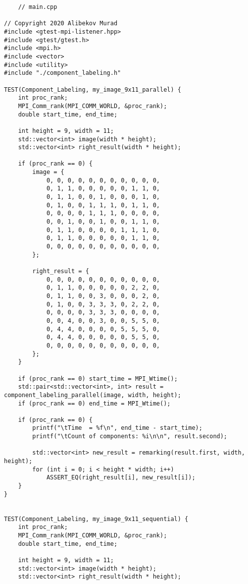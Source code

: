 \documentclass{report}
\begin{document}
	\begin{lstlisting}
	// main.cpp

// Copyright 2020 Alibekov Murad
#include <gtest-mpi-listener.hpp>
#include <gtest/gtest.h>
#include <mpi.h>
#include <vector>
#include <utility>
#include "./component_labeling.h"

TEST(Component_Labeling, my_image_9x11_parallel) {
    int proc_rank;
    MPI_Comm_rank(MPI_COMM_WORLD, &proc_rank);
    double start_time, end_time;

    int height = 9, width = 11;
    std::vector<int> image(width * height);
    std::vector<int> right_result(width * height);

    if (proc_rank == 0) {
        image = {
            0, 0, 0, 0, 0, 0, 0, 0, 0, 0, 0,
            0, 1, 1, 0, 0, 0, 0, 0, 1, 1, 0,
            0, 1, 1, 0, 0, 1, 0, 0, 0, 1, 0,
            0, 1, 0, 0, 1, 1, 1, 0, 1, 1, 0,
            0, 0, 0, 0, 1, 1, 1, 0, 0, 0, 0,
            0, 0, 1, 0, 0, 1, 0, 0, 1, 1, 0,
            0, 1, 1, 0, 0, 0, 0, 1, 1, 1, 0,
            0, 1, 1, 0, 0, 0, 0, 0, 1, 1, 0,
            0, 0, 0, 0, 0, 0, 0, 0, 0, 0, 0,
        };

        right_result = {
            0, 0, 0, 0, 0, 0, 0, 0, 0, 0, 0,
            0, 1, 1, 0, 0, 0, 0, 0, 2, 2, 0,
            0, 1, 1, 0, 0, 3, 0, 0, 0, 2, 0,
            0, 1, 0, 0, 3, 3, 3, 0, 2, 2, 0,
            0, 0, 0, 0, 3, 3, 3, 0, 0, 0, 0,
            0, 0, 4, 0, 0, 3, 0, 0, 5, 5, 0,
            0, 4, 4, 0, 0, 0, 0, 5, 5, 5, 0,
            0, 4, 4, 0, 0, 0, 0, 0, 5, 5, 0,
            0, 0, 0, 0, 0, 0, 0, 0, 0, 0, 0,
        };
    }

    if (proc_rank == 0) start_time = MPI_Wtime();
    std::pair<std::vector<int>, int> result = component_labeling_parallel(image, width, height);
    if (proc_rank == 0) end_time = MPI_Wtime();

    if (proc_rank == 0) {
        printf("\tTime  = %f\n", end_time - start_time);
        printf("\tCount of components: %i\n\n", result.second);

        std::vector<int> new_result = remarking(result.first, width, height);
        for (int i = 0; i < height * width; i++)
            ASSERT_EQ(right_result[i], new_result[i]);
    }
}


TEST(Component_Labeling, my_image_9x11_sequential) {
    int proc_rank;
    MPI_Comm_rank(MPI_COMM_WORLD, &proc_rank);
    double start_time, end_time;

    int height = 9, width = 11;
    std::vector<int> image(width * height);
    std::vector<int> right_result(width * height);


\end{lstlisting}
\end{document}
